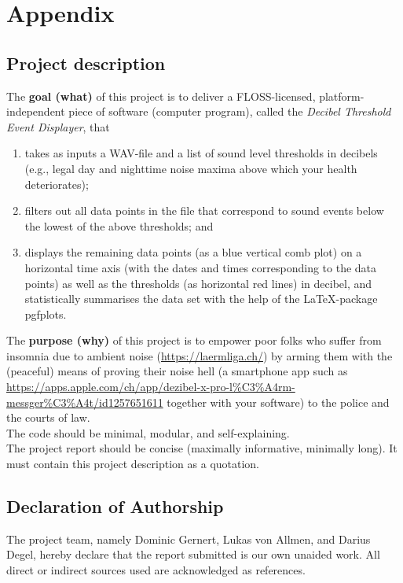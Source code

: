 \section{Appendix}\label{sec:appendix}

\subsection{Project description}\label{subsec:project-description}

The \textbf{goal (what)} of this project is to deliver a FLOSS-licensed, platform-independent piece of
software (computer program), called the \textit{Decibel Threshold Event Displayer}, that

\begin{enumerate}
    \item takes as inputs a WAV-file and a list of sound level thresholds in decibels (e.g., legal day
          and nighttime noise maxima above which your health deteriorates);
    \item filters out all data points in the file that correspond to sound events below the lowest of
          the above thresholds; and
    \item displays the remaining data points (as a blue vertical comb plot) on a horizontal time
          axis (with the dates and times corresponding to the data points) as well as the
          thresholds (as horizontal red lines) in decibel, and statistically summarises the data set
          with the help of the LaTeX-package pgfplots.
\end{enumerate}

The \textbf{purpose (why)} of this project is to empower poor folks who suffer from insomnia due to
ambient noise (\url{https://laermliga.ch/}) by arming them with the (peaceful) means of proving
their noise hell (a smartphone app such as \url{https://apps.apple.com/ch/app/dezibel-x-pro-l\%C3\%A4rm-messger\%C3\%A4t/id1257651611}
together with your software) to the police and the courts of law. \\

The code should be minimal, modular, and self-explaining. \\

The project report should be concise (maximally informative, minimally long). It must contain
this project description as a quotation.

\subsection{Declaration of Authorship}\label{subsec:declaration-of-authorship}
The project team, namely Dominic Gernert, Lukas von Allmen, and Darius Degel, hereby declare that the report submitted is our own unaided work.
All direct or indirect sources used are acknowledged as references.